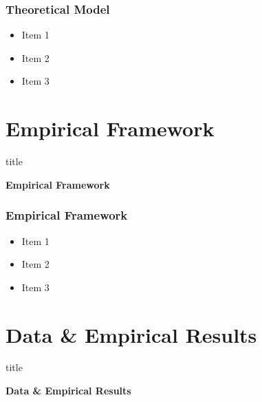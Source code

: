 \documentclass[11pt]{beamer}
\begin{document}
\begin{frame}
	\frametitle{\bfseries Theoretical Model}
	\begin{itemize}
		\item Item 1
		\item Item 2
		\item Item 3
	\end{itemize}
	
\end{frame}

\section[Framework]{Empirical Framework}
	\begin{frame}
	\begin{beamercolorbox}{title}
		\begin{center}
			\bfseries \huge Empirical Framework
		\end{center}	
	\end{beamercolorbox}
	
\end{frame}

\begin{frame}

	\frametitle{\bfseries Empirical Framework}
	\begin{itemize}
		\item Item 1
		\item Item 2
		\item Item 3
	\end{itemize}
\end{frame}

\section[Data \& Results]{Data \& Empirical Results}
	\begin{frame}
	\begin{beamercolorbox}{title}
		\begin{center}
			\bfseries \huge Data \& Empirical Results
		\end{center}	
	\end{beamercolorbox}
	
\end{frame}
\end{document}
